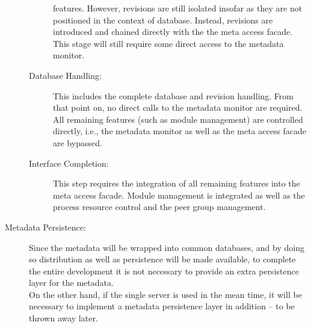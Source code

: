 \documentclass[a4paper, 10pt]{book}
\begin{document}
\begin{description}
\begin{description}
                                                features. However, revisions are still isolated insofar as they
                                                are not positioned in the context of database. Instead, revisions
                                                are introduced and chained directly with the the meta access
                                                facade.
                                                This stage will still require some direct access to the metadata
                                                monitor. 
                                            \item[Database Handling:] This includes the complete database and
                                                revision handling. From that point on, no direct calls to the
                                                metadata monitor are required. All remaining features (such as
                                                module management) are controlled directly, i.e., the metadata
                                                monitor as well as the meta access facade are bypassed. 
                                            \item[Interface Completion:] This step requires the integration of all
                                                remaining features into the meta access facade. Module
                                                management is integrated as well as the process resource
                                                control and the peer group management.
                                        \end{description}
                                    \item[Metadata Persistence:] Since the metadata will be wrapped into
                                        common databases, and by doing so distribution as well as
                                        persistence will be made available, to complete the entire
                                        development it is not necessary to provide an extra persistence
                                        layer for the metadata.\\
                                        On the other hand, if the single server is used in the mean time, it
                                        will be necessary to implement a metadata persistence layer in
                                        addition -- to be thrown away later.

\end{description}
\end{document}
